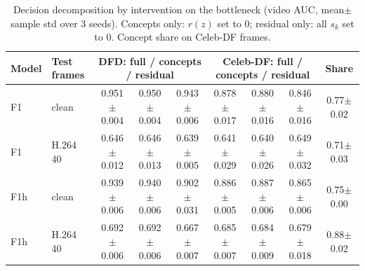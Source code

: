 \begin{table}[t]
\centering
\footnotesize
\setlength{\tabcolsep}{4pt}
\caption{Decision decomposition by intervention on the bottleneck (video AUC, mean$\pm$sample std over 3 seeds). Concepts only: $r(z)$ set to 0; residual only: all $s_k$ set to 0. Concept share on Celeb-DF frames.}
\label{tab:decomp}
\begin{tabular}{llccccccc}
\toprule
Model & Test frames & \multicolumn{3}{c}{DFD: full / concepts / residual} & \multicolumn{3}{c}{Celeb-DF: full / concepts / residual} & Share \\
\midrule
F1 & clean & 0.951$\pm$0.004 & 0.950$\pm$0.004 & 0.943$\pm$0.006 & 0.878$\pm$0.017 & 0.880$\pm$0.016 & 0.846$\pm$0.016 & 0.77$\pm$0.02 \\
F1 & H.264 40 & 0.646$\pm$0.012 & 0.646$\pm$0.013 & 0.639$\pm$0.005 & 0.641$\pm$0.029 & 0.640$\pm$0.026 & 0.649$\pm$0.032 & 0.71$\pm$0.03 \\
F1h & clean & 0.939$\pm$0.006 & 0.940$\pm$0.006 & 0.902$\pm$0.031 & 0.886$\pm$0.005 & 0.887$\pm$0.006 & 0.865$\pm$0.006 & 0.75$\pm$0.00 \\
F1h & H.264 40 & 0.692$\pm$0.006 & 0.692$\pm$0.006 & 0.667$\pm$0.007 & 0.685$\pm$0.007 & 0.684$\pm$0.009 & 0.679$\pm$0.018 & 0.88$\pm$0.02 \\
\bottomrule
\end{tabular}
\end{table}
